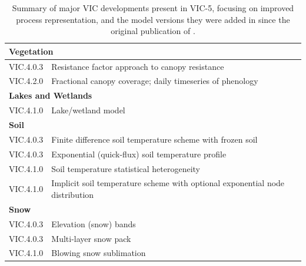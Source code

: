 \documentclass[gmd, manuscript]{copernicus}
\begin{document}
\clearpage
\begin{table}[]
  \centering
  \caption{Summary of major VIC developments present in VIC-5, focusing on improved process representation, and the model versions they were added in since the original publication of \citep{Liang_1994}.}
  \label{table:vic_development}
  \begin{tabular}{|l|l|}
    \hline
    \multicolumn{2}{|l|}{\textbf{Vegetation}}                                                                     \\ \hline
    VIC.4.0.3 & Resistance factor approach to canopy resistance \citep{Wigmosta_1994}                             \\ \hline
    VIC.4.2.0 & Fractional canopy coverage; daily timeseries of phenology \citep{Bohn_2016}                       \\ \hline
    \multicolumn{2}{|l|}{\textbf{Lakes and Wetlands}}                                                             \\ \hline
    VIC.4.1.0 & Lake/wetland model \citep{Cherkauer_2003,Bowling_2010}                                            \\ \hline
    \multicolumn{2}{|l|}{\textbf{Soil}}                                                                           \\ \hline
    VIC.4.0.3 & Finite difference soil temperature scheme with frozen soil \citep{Cherkauer_1999}                 \\ \hline
    VIC.4.0.3 & Exponential (quick-flux) soil temperature profile \citep{Liang_1999}                              \\ \hline
    VIC.4.1.0 & Soil temperature statistical heterogeneity \citep{Cherkauer_2003}                                 \\ \hline
    VIC.4.1.0 & Implicit soil temperature scheme with optional exponential node distribution \citep{Adam_2008}    \\ \hline
    \multicolumn{2}{|l|}{\textbf{Snow}}                                                                           \\ \hline
    VIC.4.0.3 & Elevation (snow) bands \citep{Nijssen_1997}                                                       \\ \hline
    VIC.4.0.3 & Multi-layer snow pack \citep{Cherkauer_1999,Andreadis_2009}                                       \\ \hline
    VIC.4.1.0 & Blowing snow sublimation \citep{Bowling_2004}                                                     \\ \hline
  \end{tabular}
\end{table}
\end{document}
